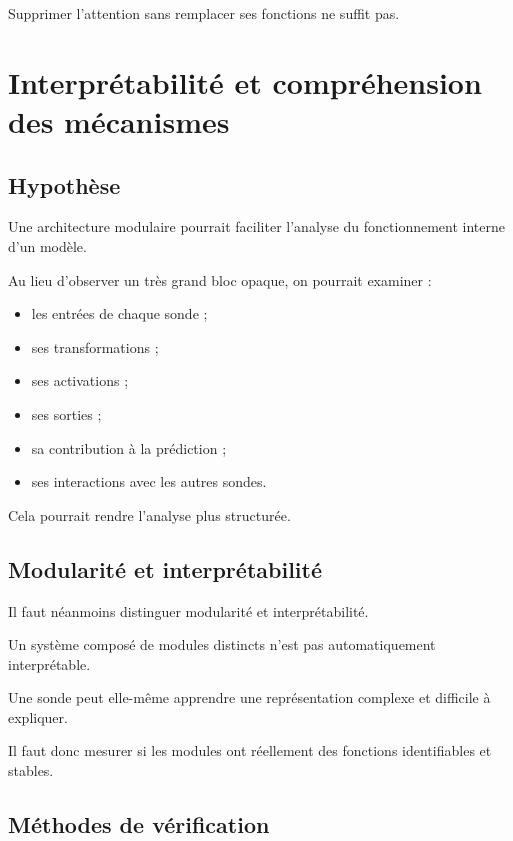 \documentclass[11pt,a4paper]{report}
\begin{document}
Supprimer l'attention sans remplacer ses fonctions
ne suffit pas.

\chapter{Interprétabilité et compréhension des mécanismes}

\section{Hypothèse}

Une architecture modulaire pourrait faciliter l'analyse
du fonctionnement interne d'un modèle.

Au lieu d'observer un très grand bloc opaque, on pourrait
examiner :

\begin{itemize}
  \item les entrées de chaque sonde ;
  \item ses transformations ;
  \item ses activations ;
  \item ses sorties ;
  \item sa contribution à la prédiction ;
  \item ses interactions avec les autres sondes.
\end{itemize}

Cela pourrait rendre l'analyse plus structurée.

\section{Modularité et interprétabilité}

Il faut néanmoins distinguer modularité et interprétabilité.

Un système composé de modules distincts n'est pas
automatiquement interprétable.

Une sonde peut elle-même apprendre une représentation
complexe et difficile à expliquer.

Il faut donc mesurer si les modules ont réellement
des fonctions identifiables et stables.

\section{Méthodes de vérification}
\end{document}
